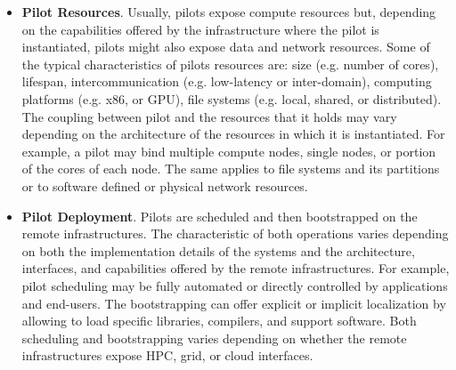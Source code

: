 \documentclass{sig-alternate}
\begin{document}
\begin{itemize}

\item \textbf{Pilot Resources}. Usually, pilots expose compute resources but,
  depending on the capabilities offered by the infrastructure where the pilot
  is instantiated, pilots might also expose data and network resources. Some of
  the typical characteristics of pilots resources are: size (e.g. number of
  cores), lifespan, intercommunication (e.g. low-latency or inter-domain),
  computing platforms (e.g. x86, or GPU), file systems (e.g. local, shared, or
  distributed). The coupling between pilot and the resources that it holds may
  vary depending on the architecture of the resources in which it is
  instantiated. For example, a pilot may bind multiple compute nodes, single
  nodes, or portion of the cores of each node. The same applies to file systems
  and its partitions or to software defined or physical network resources.


   


\item \textbf{Pilot Deployment}. Pilots are scheduled and then bootstrapped on
  the remote infrastructures. The characteristic of both operations varies
  depending on both the implementation details of the \pilot systems and the
  architecture, interfaces, and capabilities offered by the remote
  infrastructures. For example, pilot scheduling may be fully automated or
  directly controlled by applications and end-users. The bootstrapping can
  offer explicit or implicit localization by allowing to load specific
  libraries, compilers, and support software. Both scheduling and bootstrapping
  varies depending on whether the remote infrastructures expose HPC, grid, or
  cloud interfaces.


\end{itemize}
\end{document}
